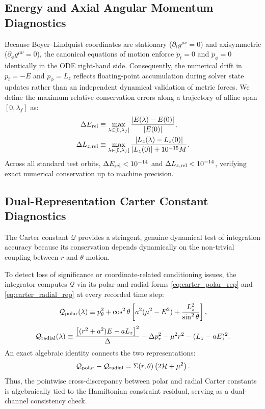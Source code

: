 \subsection{Energy and Axial Angular Momentum Diagnostics}
Because Boyer--Lindquist coordinates are stationary ($\partial_t g^{\mu\nu} = 0$) and axisymmetric ($\partial_\phi g^{\mu\nu} = 0$), the canonical equations of motion enforce $\dot{p}_t = 0$ and $\dot{p}_\phi = 0$ identically in the ODE right-hand side. Consequently, the numerical drift in $p_t = -E$ and $p_\phi = L_z$ reflects floating-point accumulation during solver state updates rather than an independent dynamical validation of metric forces. We define the maximum relative conservation errors along a trajectory of affine span $[0, \lambda_f]$ as:
\begin{align}
    \Delta E_{\rm rel} &\equiv \max_{\lambda \in [0, \lambda_f]} \frac{|E(\lambda) - E(0)|}{|E(0)|}, \label{eq:drift_energy} \\
    \Delta L_{z, \rm rel} &\equiv \max_{\lambda \in [0, \lambda_f]} \frac{|L_z(\lambda) - L_z(0)|}{|L_z(0)| + 10^{-15}M}. \label{eq:drift_angmom}
\end{align}
Across all standard test orbits, $\Delta E_{\rm rel} < 10^{-14}$ and $\Delta L_{z, \rm rel} < 10^{-14}$, verifying exact numerical conservation up to machine precision.

\subsection{Dual-Representation Carter Constant Diagnostics}
The Carter constant $\mathcal{Q}$ provides a stringent, genuine dynamical test of integration accuracy because its conservation depends dynamically on the non-trivial coupling between $r$ and $\theta$ motion.

To detect loss of significance or coordinate-related conditioning issues, the integrator computes $\mathcal{Q}$ via its polar and radial forms \eqref{eq:carter_polar_rep} and \eqref{eq:carter_radial_rep} at every recorded time step:
\begin{equation}
    \mathcal{Q}_{\rm polar}(\lambda) \equiv p_\theta^2 + \cos^2\theta \left[ a^2(\mu^2 - E^2) + \frac{L_z^2}{\sin^2\theta} \right],
\end{equation}
\begin{equation}
    \mathcal{Q}_{\rm radial}(\lambda) \equiv \frac{\left[(r^2 + a^2)E - a L_z\right]^2}{\Delta} - \Delta p_r^2 - \mu^2 r^2 - (L_z - aE)^2.
\end{equation}
An exact algebraic identity connects the two representations:
\begin{equation}
    \mathcal{Q}_{\rm polar} - \mathcal{Q}_{\rm radial} = \Sigma(r, \theta) \left( 2\mathcal{H} + \mu^2 \right).
    \label{eq:carter_cross_identity}
\end{equation}
Thus, the pointwise cross-discrepancy between polar and radial Carter constants is algebraically tied to the Hamiltonian constraint residual, serving as a dual-channel consistency check.


